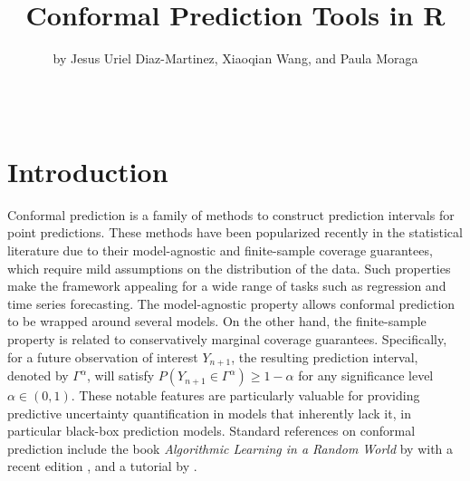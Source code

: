 \title{Conformal Prediction Tools in R}


\author{by Jesus Uriel Diaz-Martinez, Xiaoqian Wang, and Paula Moraga}

\maketitle


\[
\newcommand{\spcoord}{\boldsymbol{s}}
\newcommand{\spdomain}{\mathcal{D}}
\newcommand{\exampspace}{\textbf{Z}}
\newcommand{\exampobs}{\textbf{Z}^{(*)}}
\]

\section{Introduction}\label{introduction}

Conformal prediction is a family of methods to construct prediction
intervals for point predictions. These methods have been popularized
recently in the statistical literature due to their model-agnostic and
finite-sample coverage guarantees, which require mild assumptions on the
distribution of the data. Such properties make the framework appealing
for a wide range of tasks such as regression and time series
forecasting. The model-agnostic property allows conformal prediction to
be wrapped around several models. On the other hand, the finite-sample
property is related to conservatively marginal coverage guarantees.
Specifically, for a future observation of interest \(Y_{n+1}\), the
resulting prediction interval, denoted by \(\Gamma^{\alpha}\), will
satisfy \(P(Y_{n+1}\in\Gamma^{\alpha})\geq 1-\alpha\) for any significance
level \(\alpha\in(0,1)\). These notable features are particularly valuable
for providing predictive uncertainty quantification in models that
inherently lack it, in particular black-box prediction models. Standard
references on conformal prediction include the book \emph{Algorithmic
Learning in a Random World} by \citet{vovk2022} with a recent edition
\citep{vovk2022}, and a tutorial by \citet{shafer2008}.


